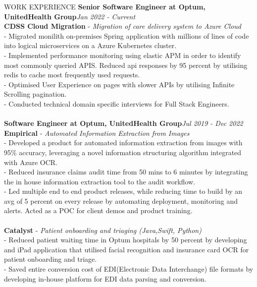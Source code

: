 \documentclass{resume} %
\begin{document}
\begin{rSection}{WORK EXPERIENCE}
{\bf Senior Software Engineer at Optum, UnitedHealth Group}\hfill {\em  Jan 2022 - Current}
\\ {\bf CDSS Cloud Migration} - {\em Migration of care delivery system to Azure Cloud}
\\ - Migrated monilith on-premises Spring application with millions of lines of code into logical microservices on a Azure Kubernetes cluster.
\\ - Implemented performance monitoring using elastic APM in order to identify most commonly queried APIS. Reduced api responses by 95 percent by utilising redis to cache most frequently used requests.
\\ - Optimised User Experience on pages with slower APIs by utilising Infinite Scrolling pagination.
\\ - Conducted technical domain specific interviews for Full Stack Engineers.
\\[-0.9em]
\\{\bf Software Engineer at Optum, UnitedHealth Group}\hfill {\em  Jul 2019 - Dec 2022}
\\{\bf Empirical} - {\em Automated Information Extraction from Images}
\\ - Developed a product for automated information extraction from images with 95\% accuracy, leveraging a novel information structuring algorithm integrated with Azure OCR.
\\ - Reduced insurance claims audit time from 50 mins to 6 minutes by integrating the in house information extraction tool to the audit workflow.
\\- Led multiple end to end product releases, while reducing time to build by an avg of 5 percent on every release by automating  deployment, monitoring and alerts. Acted as a POC for client demos and product training.
\\[-0.9em]
\\{\bf Catalyst} - {\em Patient onboarding and triaging (Java,Swift, Python)}
\\ - Reduced patient waiting time in Optum hospitals by 50 percent by developing and iPad application that utilised facial recognition and insurance card OCR for patient onboarding and triage.
\\ - Saved entire conversion cost of EDI(Electronic Data Interchange) file formats by developing in-house platform for EDI data parsing and conversion.

\end{rSection}
\end{document}
